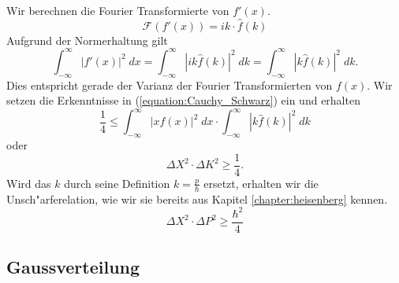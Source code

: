 \begin{refsection}
Wir berechnen die Fourier Transformierte von $f'(x)$.
\begin{equation}	
\mathcal{F}(f'(x)) = ik \cdot \hat{f}(k)
\end{equation}
Aufgrund der Normerhaltung gilt
\begin{equation}	
\int_{-\infty}^{\infty} \left| f'(x)\right|^{2}\; dx = \int_{-\infty}^{\infty} \left| ik \hat{f}(k)\right|^{2}\; dk= \int_{-\infty}^{\infty} \left| k \hat{f}(k)\right|^{2}\; dk.
\end{equation}
Dies entspricht gerade der Varianz der Fourier Transformierten von $f(x)$. Wir setzen die Erkenntnisse in (\ref{equation:Cauchy_Schwarz}) ein und erhalten
\begin{equation}
\frac{1}{4}\leq \int_{-\infty}^{\infty} \left| x f(x)\right|^{2}\; dx \cdot \int_{-\infty}^{\infty} \left| k \hat{f}(k)\right|^{2}\; dk
\end{equation}
oder
\begin{equation}
\varDelta X^{2}\cdot\varDelta K^{2}\geq\frac{1}{4}.
\end{equation}
Wird das $k$ durch seine Definition $k = \frac{p}{\hbar}$ ersetzt, erhalten wir die Unsch"arferelation, wie wir sie bereits aus Kapitel \ref{chapter:heisenberg} kennen.
\begin{equation}
\varDelta X^{2}\cdot\varDelta P^{2}\geq\frac{\hbar^{2}}{4}
\label{equation:ort_impuls_unschaerfe}
\end{equation}

\subsection{Gaussverteilung}


\end{refsection}
